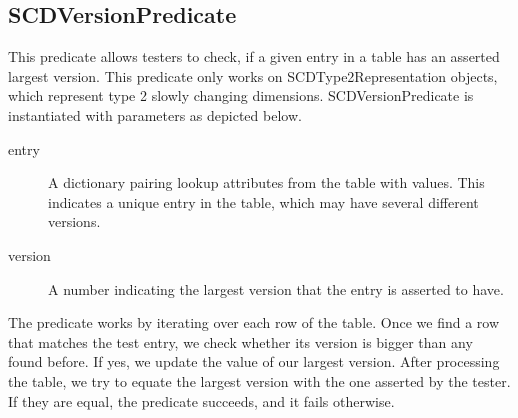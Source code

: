 \subsection{SCDVersionPredicate}\label{SCD}

This predicate allows testers to check, if a given entry in a table has an asserted largest version. This predicate only works on SCDType2Representation objects, which represent type 2 slowly changing dimensions. SCDVersionPredicate is instantiated with parameters as depicted below.


\begin{description}
\item [entry] A dictionary pairing lookup attributes from the table with values. This indicates a unique entry in the table, which may have several different versions. 
\item [version] A number indicating the largest version that the entry is asserted to have.
\end{description}

The predicate works by iterating over each row of the table. Once we find a row that matches the test entry, we check whether its version is bigger than any found before. If yes, we update the value of our largest version. After processing the table, we try to equate the largest version with the one asserted by the tester. If they are equal, the predicate succeeds, and it fails otherwise.   

